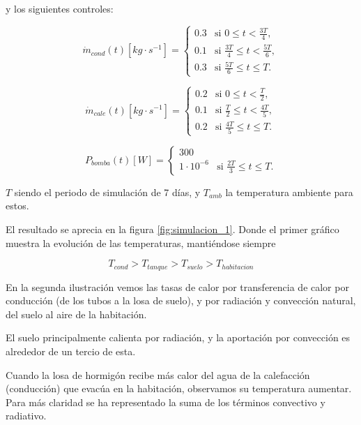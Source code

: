 y los siguientes controles:

\begin{equation}
	\dot{m}_{cond}(t)[kg \cdot s^{-1}] =
	\begin{cases}
		0.3 & \text{si } 0 \leq t < \frac{3T}{4},            \\
		0.1 & \text{si } \frac{3T}{4} \leq t < \frac{5T}{6}, \\
		0.3 & \text{si } \frac{5T}{6} \leq t \leq T.
	\end{cases}
\end{equation}

\begin{equation}
	\dot{m}_{cale}(t)[kg \cdot s^{-1}] =
	\begin{cases}
		0.2 & \text{si } 0 \leq t < \frac{T}{2},            \\
		0.1 & \text{si } \frac{T}{2} \leq t < \frac{4T}{5}, \\
		0.2 & \text{si } \frac{4T}{5} \leq t \leq T.
	\end{cases}
\end{equation}

\begin{equation}
	P_{bomba}(t)[W] =
	\begin{cases}
		300                                                      \\
		1 \cdot 10^{-6} & \text{si } \frac{2T}{3} \leq t \leq T.
	\end{cases}
\end{equation}

$T$ siendo el periodo de simulación de 7 días, y $T_{amb}$ la temperatura
ambiente para estos.

El resultado se aprecia en la figura \ref{fig:simulacion_1}.
Donde el primer gráfico muestra la evolución de las temperaturas,
mantiéndose siempre

\begin{equation*}
	T_{cond} > T_{tanque} > T_{suelo} > T_{habitacion}
\end{equation*}

En la segunda ilustración vemos las tasas de calor por transferencia de calor
por conducción (de los tubos a la losa de suelo), y por radiación y convección
natural, del suelo al aire de la habitación.

El suelo principalmente calienta por radiación, y la aportación por
convección es alrededor de un tercio de esta.

Cuando la losa de hormigón recibe más calor del agua de la calefacción
(conducción) que evacúa en la habitación, observamos su temperatura aumentar.
Para más claridad se ha representado la suma de los términos convectivo y
radiativo.


